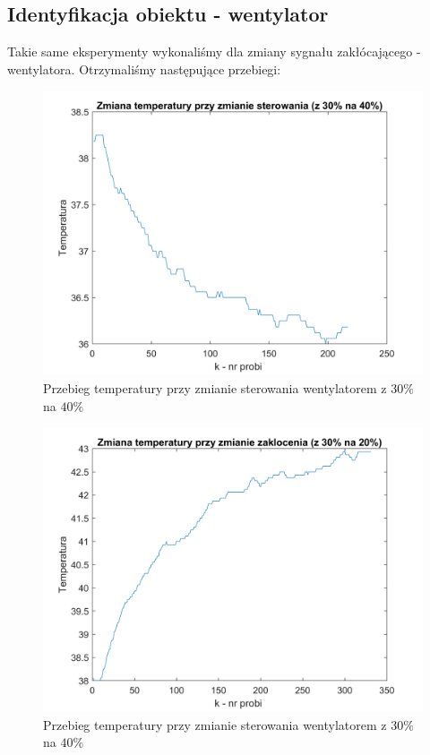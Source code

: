 \documentclass[12pt, a4paper]{article}
\begin{document}
\subsection{Identyfikacja obiektu - wentylator}
Takie same eksperymenty wykonaliśmy dla zmiany sygnału zakłócającego - wentylatora. Otrzymaliśmy następujące przebiegi:\\
\begin{figure}[H]
	\centering
	\includegraphics[width=0.9\linewidth]{nnor_od_skok_wg}
	\caption{Przebieg temperatury przy zmianie sterowania wentylatorem z $30\%$ na $40\%$}
	\label{fig:nnoswg}
\end{figure}
\begin{figure}[H]
	\centering
	\includegraphics[width=0.9\linewidth]{nnor_od_skok_wd}
	\caption{Przebieg temperatury przy zmianie sterowania wentylatorem z $30\%$ na $40\%$}
	\label{fig:nnoswd}
\end{figure}
\end{document}
